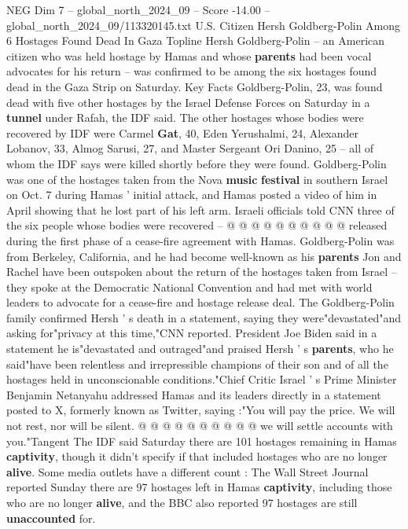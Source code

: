 \begin{textsample}{NEG Dim 7 – global\_north\_2024\_09 – Score -14.00 – global\_north\_2024\_09/113320145.txt}  \label{ex:f7_neg_005}
U.S.
Citizen Hersh Goldberg-Polin Among 6 Hostages Found Dead In Gaza Topline Hersh Goldberg-Polin -- an American citizen who was held hostage by Hamas and whose \textbf{parents} had been vocal advocates for his return -- was confirmed to be among the six hostages found dead in the Gaza Strip on Saturday.
Key Facts Goldberg-Polin, 23, was found dead with five other hostages by the Israel Defense Forces on Saturday in a \textbf{tunnel} under Rafah, the IDF said.
The other hostages whose bodies were recovered by IDF were Carmel \textbf{Gat}, 40, Eden Yerushalmi, 24, Alexander Lobanov, 33, Almog Sarusi, 27, and Master Sergeant Ori Danino, 25 -- all of whom the IDF says were killed shortly before they were found.
Goldberg-Polin was one of the hostages taken from the Nova \textbf{music} \textbf{festival} in southern Israel on Oct. 7 during Hamas ' initial attack, and Hamas posted a video of him in April showing that he lost part of his left arm.
Israeli officials told CNN three of the six people whose bodies were recovered -- @ @ @ @ @ @ @ @ @ @ released during the first phase of a cease-fire agreement with Hamas.
Goldberg-Polin was from Berkeley, California, and he had become well-known as his \textbf{parents} Jon and Rachel have been outspoken about the return of the hostages taken from Israel -- they spoke at the Democratic National Convention and had met with world leaders to advocate for a cease-fire and hostage release deal.
The Goldberg-Polin family confirmed Hersh ' s death in a statement, saying they were"devastated"and asking for"privacy at this time,"CNN reported.
President Joe Biden said in a statement he is"devastated and outraged"and praised Hersh ' s \textbf{parents}, who he said"have been relentless and irrepressible champions of their son and of all the hostages held in unconscionable conditions."Chief Critic Israel ' s Prime Minister Benjamin Netanyahu addressed Hamas and its leaders directly in a statement posted to X, formerly known as Twitter, saying :"You will pay the price.
We will not rest, nor will be silent. @ @ @ @ @ @ @ @ @ @ we will settle accounts with you."Tangent The IDF said Saturday there are 101 hostages remaining in Hamas \textbf{captivity}, though it didn't specify if that included hostages who are no longer \textbf{alive}.
Some media outlets have a different count : The Wall Street Journal reported Sunday there are 97 hostages left in Hamas \textbf{captivity}, including those who are no longer \textbf{alive}, and the BBC also reported 97 hostages are still \textbf{unaccounted} for.

\end{textsample}
